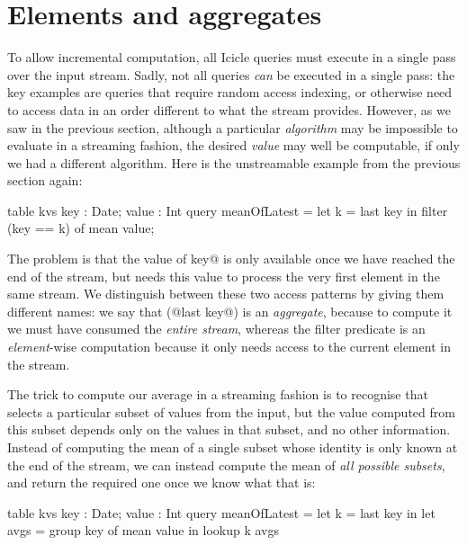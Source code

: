 
\section{Elements and aggregates}
\label{icicle:s:ElementsAndAggregates}
To allow incremental computation, all Icicle queries must execute in a single pass over the input stream.
Sadly, not all queries \emph{can} be executed in a single pass: the key examples are queries that require random access indexing, or otherwise need to access data in an order different to what the stream provides.
However, as we saw in the previous section, although a particular \emph{algorithm} may be impossible to evaluate in a streaming fashion, the desired \emph{value} may well be computable, if only we had a different algorithm.
Here is the unstreamable example from the previous section again:
\begin{icicle}
  table kvs { key : Date; value : Int }
  query meanOfLatest
   = let k = last key in
     filter (key == k) of mean value;
\end{icicle}

The problem is that the value of \Ic@last key@ is only available once we have reached the end of the stream, but \Ic@filter@ needs this value to process the very first element in the same stream.
We distinguish between these two access patterns by giving them different names: we say that (@last key@) is an \emph{aggregate}, because to compute it we must have consumed the \emph{entire stream}, whereas the filter predicate is an \emph{element}-wise computation because it only needs access to the current element in the stream.

The trick to compute our average in a streaming fashion is to recognise that \Ic@filter@ selects a particular subset of values from the input, but the value computed from this subset depends only on the values in that subset, and no other information. Instead of computing the mean of a single subset whose identity is only known at the end of the stream, we can instead compute the mean of \emph{all possible subsets}, and return the required one once we know what that is:
\begin{icicle}
  table kvs { key : Date; value : Int } 
  query meanOfLatest
   = let k    = last  key in
     let avgs = group key of mean value in
     lookup k avgs
\end{icicle}

